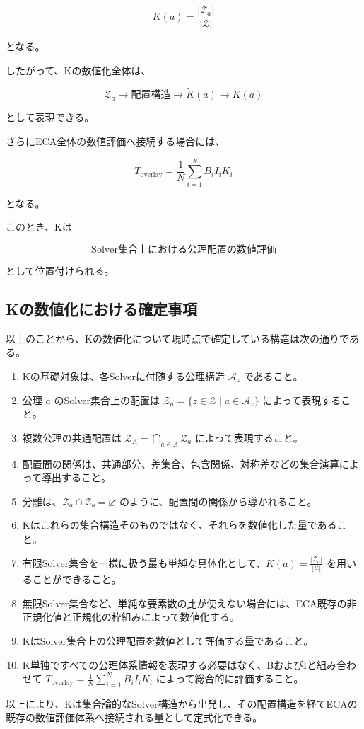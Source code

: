 \[
\boxed{K(a) = \frac{|\mathcal{Z}_a|}{|\mathcal{Z}|}}
\]

となる。

したがって、Kの数値化全体は、

\[
\boxed{
\mathcal{Z}_a
\longrightarrow
\text{配置構造}
\longrightarrow
\widetilde{K}(a)
\longrightarrow
K(a)
}
\]

として表現できる。

さらにECA全体の数値評価へ接続する場合には、

\[
\boxed{T_{\mathrm{overlay}} = \frac{1}{N}\sum_{i=1}^{N}B_iI_iK_i}
\]

となる。

このとき、Kは

\[
\boxed{
\text{Solver集合上における公理配置の数値評価}
}
\]

として位置付けられる。

\subsection{Kの数値化における確定事項}

以上のことから、Kの数値化について現時点で確定している構造は次の通りである。

\begin{enumerate}
\item Kの基礎対象は、各Solverに付随する公理構造 $\mathcal{A}_z$ であること。
\item 公理 $a$ のSolver集合上の配置は $\mathcal{Z}_a = \{z\in\mathcal{Z}\mid a\in\mathcal{A}_z\}$ によって表現すること。
\item 複数公理の共通配置は $\mathcal{Z}_A = \bigcap_{a\in A}\mathcal{Z}_a$ によって表現すること。
\item 配置間の関係は、共通部分、差集合、包含関係、対称差などの集合演算によって導出すること。
\item 分離は、$\mathcal{Z}_a\cap\mathcal{Z}_b=\varnothing$ のように、配置間の関係から導かれること。
\item Kはこれらの集合構造そのものではなく、それらを数値化した量であること。
\item 有限Solver集合を一様に扱う最も単純な具体化として、$K(a) = \frac{|\mathcal{Z}_a|}{|\mathcal{Z}|}$ を用いることができること。
\item 無限Solver集合など、単純な要素数の比が使えない場合には、ECA既存の非正規化値と正規化の枠組みによって数値化する。
\item KはSolver集合上の公理配置を数値として評価する量であること。
\item K単独ですべての公理体系情報を表現する必要はなく、BおよびIと組み合わせて $T_{\mathrm{overlay}} = \frac{1}{N} \sum_{i=1}^{N}B_iI_iK_i$ によって総合的に評価すること。
\end{enumerate}

以上により、Kは集合論的なSolver構造から出発し、その配置構造を経てECAの既存の数値評価体系へ接続される量として定式化できる。